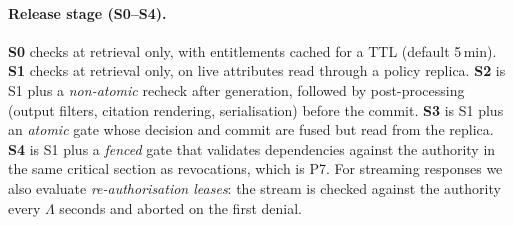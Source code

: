 \documentclass[10pt]{article}
\begin{document}
\paragraph{Release stage (S0--S4).}
\textbf{S0} checks at retrieval only, with entitlements cached for a TTL (default 5\,min). \textbf{S1} checks at retrieval only, on live attributes read through a policy replica. \textbf{S2} is S1 plus a \emph{non-atomic} recheck after generation, followed by post-processing (output filters, citation rendering, serialisation) before the commit. \textbf{S3} is S1 plus an \emph{atomic} gate whose decision and commit are fused but read from the replica. \textbf{S4} is S1 plus a \emph{fenced} gate that validates dependencies against the authority in the same critical section as revocations, which is P7. For streaming responses we also evaluate \emph{re-authorisation leases}: the stream is checked against the authority every $\Lambda$ seconds and aborted on the first denial.
\end{document}
